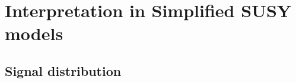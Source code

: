 \section{Interpretation in Simplified SUSY models}
\label{app:susy}

\subsection{Signal distribution}
\label{app:susy-mr-plots}

%
%
